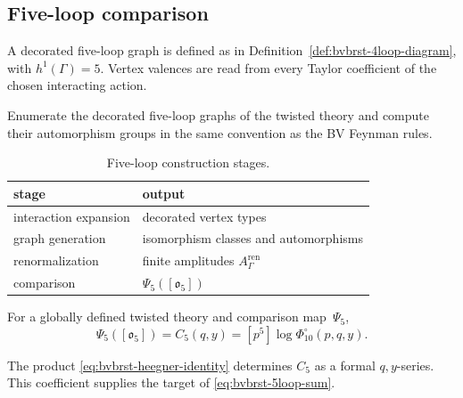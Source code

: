 \subsection{Five-loop comparison}
\label{subsec:bvbrst-5loop-extension}

\begin{definition}
\label{def:bvbrst-5loop-diagram}
A decorated five-loop graph is defined as in
Definition~\ref{def:bvbrst-4loop-diagram}, with
$h^1(\Gamma)=5$.  Vertex valences are read from every Taylor
coefficient of the chosen interacting action.
\end{definition}

\begin{problem}
\label{prop:bvbrst-5loop-kreimer}
Enumerate the decorated five-loop graphs of the twisted theory and
compute their automorphism groups in the same convention as the BV
Feynman rules.
\end{problem}

\begin{table}[ht]
\centering
\begin{tabular}{@{}ll@{}}
\toprule
stage & output \\
\midrule
interaction expansion & decorated vertex types \\
graph generation & isomorphism classes and automorphisms \\
renormalization & finite amplitudes $A_\Gamma^{\mathrm{ren}}$ \\
comparison & $\Psi_5([\mathfrak o_5])$ \\
\bottomrule
\end{tabular}
\caption{Five-loop construction stages.}
\label{tab:bvbrst-5loop-enum}
\end{table}

\begin{conjecture}
\label{thm:bvbrst-5loop-sum}
For a globally defined twisted theory and comparison map~$\Psi_5$,
\begin{equation}\label{eq:bvbrst-5loop-sum}
 \Psi_5([\mathfrak o_5])=C_5(q,y)
 =[p^5]\log\Phi_{10}^{\circ}(p,q,y).
\end{equation}
\end{conjecture}

\begin{remark}
\label{rem:bvbrst-5loop-cross-verify}
The product \eqref{eq:bvbrst-heegner-identity} determines $C_5$ as a
formal $q,y$-series.  This coefficient supplies the target of
\eqref{eq:bvbrst-5loop-sum}.
\end{remark}

